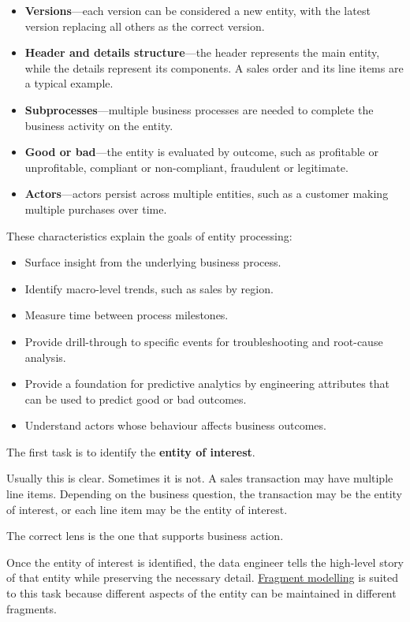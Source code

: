 \documentclass[10pt,openany,10pt]{book}
\providecommand{\tightlist}{%
  \setlength{\itemsep}{0pt}\setlength{\parskip}{0pt}}
\begin{document}
\begin{itemize}
\tightlist
\item
  \textbf{Versions}---each version can be considered a new entity, with
  the latest version replacing all others as the correct version.
\item
  \textbf{Header and details structure}---the header represents the main
  entity, while the details represent its components. A sales order and
  its line items are a typical example.
\item
  \textbf{Subprocesses}---multiple business processes are needed to
  complete the business activity on the entity.
\item
  \textbf{Good or bad}---the entity is evaluated by outcome, such as
  profitable or unprofitable, compliant or non-compliant, fraudulent or
  legitimate.
\item
  \textbf{Actors}---actors persist across multiple entities, such as a
  customer making multiple purchases over time.
\end{itemize}

These characteristics explain the goals of entity processing:

\begin{itemize}
\tightlist
\item
  Surface insight from the underlying business process.
\item
  Identify macro-level trends, such as sales by region.
\item
  Measure time between process milestones.
\item
  Provide drill-through to specific events for troubleshooting and
  root-cause analysis.
\item
  Provide a foundation for predictive analytics by engineering
  attributes that can be used to predict good or bad outcomes.
\item
  Understand actors whose behaviour affects business outcomes.
\end{itemize}

The first task is to identify the \textbf{entity of interest}.

Usually this is clear. Sometimes it is not. A sales transaction may have
multiple line items. Depending on the business question, the transaction
may be the entity of interest, or each line item may be the entity of
interest.

The correct lens is the one that supports business action.

Once the entity of interest is identified, the data engineer tells the
high-level story of that entity while preserving the necessary detail.
\hyperref[docs-creating-information-expressiveness-and-fragment-modelling]{Fragment
modelling} is suited to this task because different aspects of the
entity can be maintained in different fragments.
\end{document}
